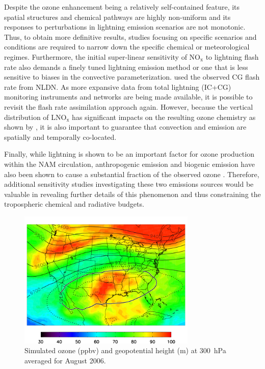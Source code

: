 Despite the ozone enhancement being a relatively self-contained feature,
its spatial structures and chemical pathways are highly non-uniform and
its responses to perturbations in lightning emission scenarios are not
monotonic. Thus, to obtain more definitive results, studies focusing on
specific scenarios and conditions are required to narrow down the
specific chemical or meteorological regimes.
Furthermore, the initial super-linear sensitivity of NO$_\mathrm{x}$ to
lightning flash rate also demands a finely tuned lightning emission
method or one that is less sensitive to biases in the convective
parameterization. \citet{Cooper:2009nx} used the observed CG
flash rate from NLDN. As more expansive data from  total lightning (IC+CG)
monitoring instruments and networks are being made available, it is possible to
revisit the flash rate assimilation approach again. However, because
the vertical distribution of LNO$_\mathrm{x}$ has significant
impacts on the resulting ozone chemistry as shown by \citet{Pickering:1998sh}, it is also important to guarantee
that convection and emission are spatially and temporally co-located.


Finally, while lightning is shown to be an important factor for ozone
production within the NAM circulation, anthropogenic emission and
biogenic emission have also been shown to cause a substantial
fraction of the observed ozone \citep{Li:2005ss}. Therefore, additional
sensitivity studies investigating these two emissions sources would
be valuable in revealing further details of this phenomenon and
thus constraining the tropospheric chemical and radiative budgets.

 \begin{figure}
 \noindent\includegraphics[width=20pc]{figures/o3_map.png}
 \caption{Simulated ozone (ppbv) and geopotential height (m) at 300~hPa averaged for August
2006.}
 \label{fig:o3_map}
 \end{figure}


